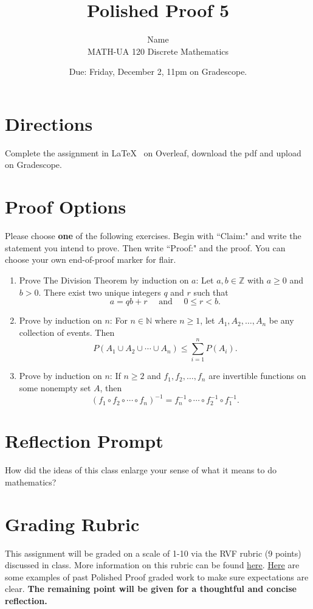 \documentclass{article}
\title{Polished Proof 5}
\author{%
	Name
	\\
	MATH-UA 120 Discrete Mathematics
}
\date{Due: Friday, December 2, 11pm on Gradescope.}
\theoremstyle{definition}
\begin{document}
	\maketitle
	
	\section*{Directions}

Complete the assignment in \LaTeX~  on Overleaf, download the pdf and upload on Gradescope.


\section*{Proof Options}

Please choose \textbf{one} of the following exercises. Begin with ``Claim:" and write the statement you intend to prove. Then write ``Proof:" and the proof. You can choose your own end-of-proof marker for flair.

\begin{enumerate}
	\item  Prove The Division Theorem by induction on $a$: Let $a, b\in\mathbb{Z}$ with $a\geq 0$ and $b>0$. There exist two unique integers $q$ and $r$ such that 
	\[ a=qb+r \quad \text{ and } \quad 0\leq r<b.\] 
	\item Prove by induction on $n$: For $n\in \mathbb{N}$ where $n\geq 1$, let $A_1, A_2, \dots, A_n$ be any collection of events. Then 
	\[ P\left( A_1\cup A_2 \cup \cdots \cup A_n\right) \leq \sum_{i=1}^n P(A_i).\]
	\item Prove by induction on $n$: If $n\geq 2$ and $f_1, f_2, \dots, f_n$ are invertible functions on some nonempty set $A$, then 
	\[ (f_1 \circ f_2 \circ \cdots \circ f_n)^{-1} = f_n^{-1} \circ \cdots \circ f_2^{-1} \circ f_1^{-1}.\]
\end{enumerate}

\section*{Reflection Prompt}
How did the ideas of this class enlarge your sense of what it means to do mathematics?

\section*{Grading Rubric}
This assignment will be graded on a scale of 1-10 via the RVF rubric (9 points) discussed in class. More information on this rubric can be found \href{https://drive.google.com/file/d/1P0OBjw-GkX64uCpYcqYmXARapf9MwaiI/view?usp=sharing}{here}. \href{https://drive.google.com/file/d/1KAFQ7GBFpfUkyTBRZ30h5o6nXWwYDSML/view?usp=sharing}{Here} are some examples of past Polished Proof graded work to make sure expectations are clear. \textbf{The remaining point will be given for a thoughtful and concise reflection.}


	
\end{document}
